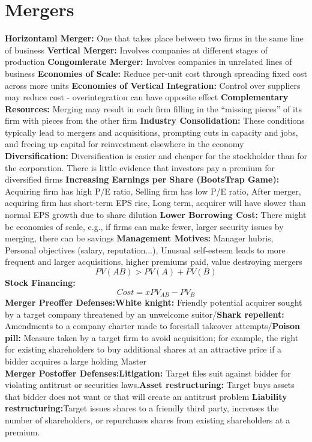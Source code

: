 \documentclass{cheatsheet}
\begin{document}
\section{Mergers}
\textbf{Horizontaml Merger:} One that takes place between two firms
in the same line of business
\textbf{Vertical Merger:} Involves companies at different stages of production
\textbf{Congomlerate Merger:} Involves companies in unrelated lines of business
\textbf{Economies of Scale:} Reduce per-unit cost through spreading fixed cost across more units
\textbf{Economies of Vertical Integration:} Control over suppliers may reduce cost - overintegration can have opposite effect
\textbf{Complementary Resources:} Merging may result in each firm filling in the “missing pieces” of its firm with pieces from the other firm
\textbf{Industry Consolidation:} These conditions typically lead to mergers and acquisitions, prompting cuts in capacity and jobs, and freeing up capital for reinvestment elsewhere in the economy
\textbf{Diversification:} Diversification is easier and cheaper for the stockholder than for the corporation. There is little evidence that investors pay a premium for diversified firms
\textbf{Increasing Earnings per Share (BootsTrap Game):} Acquiring firm has high P/E ratio, Selling firm has low P/E ratio, After merger, acquiring firm has short-term EPS rise, Long term, acquirer will have slower than normal EPS growth due to share dilution 
\textbf{Lower Borrowing Cost:} There might be economies of scale, e.g., if firms can make fewer, larger security issues by merging, there can be savings
\textbf{Management Motives:} Manager hubris, Personal objectives (salary, reputation...), Unusual self-esteem leads to more frequent and larger acquisitions, higher premiums paid, value destroying mergers
\[PV(AB) > PV(A) + PV(B)\]
\textbf{Stock Financing:} \[Cost = xPV_{AB} - PV_B\]
\textbf{Merger Preoffer Defenses:}\textbf{White knight:} Friendly potential acquirer sought by a target company threatened by an unwelcome suitor/\textbf{Shark repellent:} Amendments to a company charter made to forestall takeover attempts/\textbf{Poison pill:} Measure taken by a target firm to avoid acquisition; for example, the right for existing
shareholders to buy additional shares at an attractive price if a bidder acquires a large holding Master\\
\textbf{Merger Postoffer Defenses:}\textbf{Litigation:} Target files suit against bidder for violating antitrust or securities laws.\textbf{Asset restructuring:} Target buys assets that bidder does not want or that will create an antitrust problem \textbf{Liability restructuring:}Target issues shares to a friendly third party, increases the number of shareholders, or
repurchases shares from existing shareholders at a premium.\\
\end{document}
